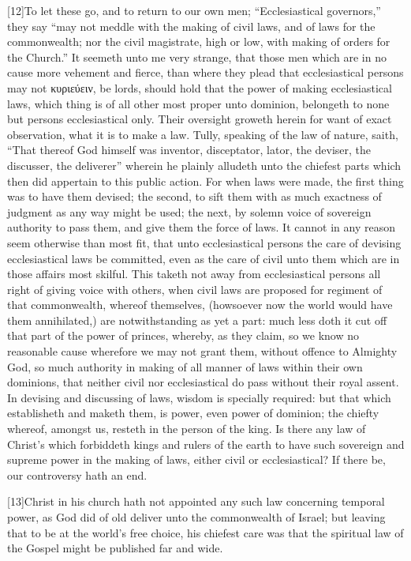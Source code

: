[12]To let these go, and to return to our own men; “Ecclesiastical governors,” they say “may not meddle with the making of civil laws, and of laws for the commonwealth; nor the civil magistrate, high or low, with making of orders for the Church.” It seemeth unto me very strange, that those men which are in no cause more vehement and fierce, than where they plead that ecclesiastical persons may not κυριεύειν, be lords, should hold that the power of making ecclesiastical laws, which thing is of all other most proper unto  dominion, belongeth to none but persons ecclesiastical only. Their oversight groweth herein for want of exact observation, what it is to make a law. Tully, speaking of the law of nature, saith, “That thereof God himself was inventor, disceptator, lator, the deviser, the discusser, the deliverer” wherein he plainly alludeth unto the chiefest parts which then did appertain to this public action. For when laws were made, the first thing was to have them devised; the second, to sift them with as much exactness of judgment as any way might be used; the next, by solemn voice of sovereign authority to pass them, and give them the force of laws. It cannot in any reason seem otherwise than most fit, that unto ecclesiastical persons the care of devising ecclesiastical laws be committed, even as the care of civil unto them which are in those affairs most skilful. This taketh not away from ecclesiastical persons all right of giving voice with others, when civil laws are proposed for regiment of that commonwealth, whereof themselves, (howsoever now the world would have them annihilated,) are notwithstanding as yet a part: much less doth it cut off that part of the power of princes, whereby, as they claim, so we know no reasonable cause wherefore we may not grant them, without offence to Almighty God, so much authority in making of all manner of laws within their own dominions, that neither civil nor ecclesiastical do pass without their royal assent. In devising and discussing of laws, wisdom is specially required: but that which establisheth and maketh them, is power, even power of dominion; the chiefty whereof, amongst us, resteth in the person of the king. Is there any law of Christ’s which forbiddeth kings and rulers of the earth to have such sovereign and supreme power in the making of laws, either civil or ecclesiastical? If there be, our controversy hath an end.

[13]Christ in his church hath not appointed any such law concerning temporal power, as God did of old deliver unto the commonwealth of Israel; but leaving that to be at the  world’s free choice, his chiefest care was that the spiritual law of the Gospel might be published far and wide.

